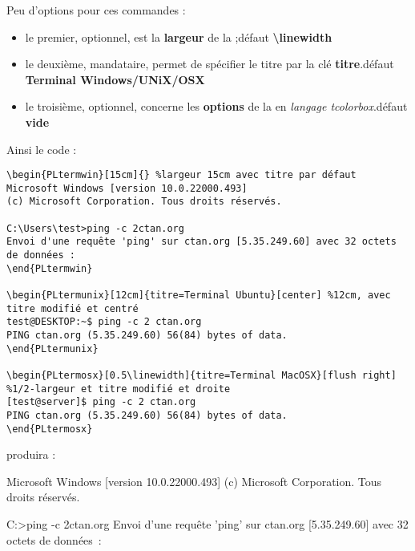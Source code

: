 \documentclass{article}
\newcommand\ctex[1]{\tcbox[vignettelatex]{#1}}
\newcommand\Cle[1]{{\bfseries\sffamily\textlangle #1\textrangle}}
\begin{document}
Peu d'options pour ces commandes :

\begin{itemize}
	\item le premier, optionnel, est la \Cle{largeur} de la \ctex{tcbox} ;\hfill{}défaut \Cle{\textbackslash linewidth}
	\item le deuxième, mandataire, permet de spécifier le titre par la clé \Cle{titre}.\hfill{}défaut \Cle{Terminal Windows/UNiX/OSX}
	\item le troisième, optionnel, concerne les \Cle{options} de la \ctex{tcbox} en \textit{langage tcolorbox}.\hfill{}défaut \Cle{vide}
\end{itemize}

\medskip

Ainsi le code :

\begin{verbatim}
\begin{PLtermwin}[15cm]{} %largeur 15cm avec titre par défaut
Microsoft Windows [version 10.0.22000.493]
(c) Microsoft Corporation. Tous droits réservés.

C:\Users\test>ping -c 2ctan.org
Envoi d'une requête 'ping' sur ctan.org [5.35.249.60] avec 32 octets de données :
\end{PLtermwin}

\begin{PLtermunix}[12cm]{titre=Terminal Ubuntu}[center] %12cm, avec titre modifié et centré
test@DESKTOP:~$ ping -c 2 ctan.org
PING ctan.org (5.35.249.60) 56(84) bytes of data.
\end{PLtermunix}

\begin{PLtermosx}[0.5\linewidth]{titre=Terminal MacOSX}[flush right] %1/2-largeur et titre modifié et droite
[test@server]$ ping -c 2 ctan.org
PING ctan.org (5.35.249.60) 56(84) bytes of data.
\end{PLtermosx}
\end{verbatim}

produira :

\begin{PLtermwin}[15cm]{}
Microsoft Windows [version 10.0.22000.493]
(c) Microsoft Corporation. Tous droits réservés.

C:\Users\test>ping -c 2ctan.org
Envoi d'une requête 'ping' sur ctan.org [5.35.249.60] avec 32 octets de données :
\end{PLtermwin}

\end{document}
